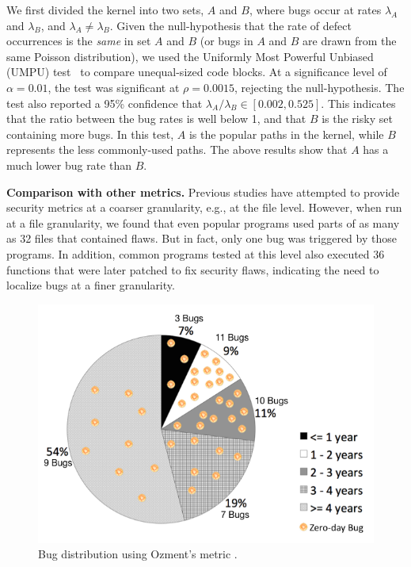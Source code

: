 We first divided the kernel into two sets,
$A$ and $B$, where bugs occur at rates $\lambda_A$ and
$\lambda_B$, and $\lambda_A \neq \lambda_B$. Given the null-hypothesis
that the rate of defect occurrences is the \textit{same} in set $A$ and $B$
(or bugs in $A$ and $B$ are drawn from the same Poisson distribution),
we used the Uniformly Most Powerful Unbiased (UMPU) test~\cite{shiue1982experiment}
to compare unequal-sized code blocks.
At a significance level of $\alpha=0.01$, the test was significant at
$\rho=0.0015$, rejecting the null-hypothesis.
The test also reported a 95\% confidence that $\lambda_A / \lambda_B
\in [0.002, 0.525]$. This indicates that the ratio between the bug rates is well
below 1, and that $B$ is the risky set containing more bugs.
In this test, $A$ is the popular paths in the kernel, while $B$
represents the less commonly-used paths. The above results show that
$A$ has a much lower bug rate than $B$.

\textbf{Comparison with other metrics.}
Previous studies have attempted to provide security metrics at a coarser granularity,
e.g., at the file level. However, when run at a file
granularity, we found that even popular programs used parts of as many as
32 files that contained flaws. But in fact, only one bug was triggered by those programs.
In addition, common programs tested at this level also executed 36 functions
that were later patched to fix security
flaws, indicating the need to localize bugs at a finer granularity.

\begin{figure}
\centering
\includegraphics[width=1.0\columnwidth]{diagram/metrics_age.png}
\caption{\small Bug distribution using Ozment's metric \cite{ozment2006milk}.}
\label{fig:metrics_age}
\end{figure}


